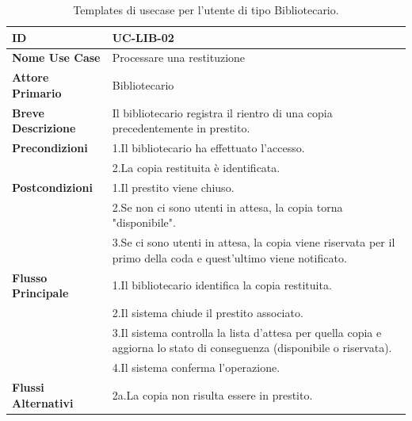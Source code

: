 \documentclass[
  italian,
  paper=a4,
  ,captions=tableheading
]{scrbook}
\begin{document}
\begin{table}[h!]
\begin{minipage}{0.45\textwidth}
{\begin{tabular}{|p{4.5cm}|p{10cm}|}
\textbf{ID} & UC-LIB-02 \\ \hline
\textbf{Nome Use Case} & Processare una restituzione \\ \hline
\textbf{Attore Primario} & Bibliotecario \\ \hline
\textbf{Breve Descrizione} & Il bibliotecario registra il rientro di una copia precedentemente in prestito. \\ \hline
\textbf{Precondizioni} & 1.\;Il bibliotecario ha effettuato l'accesso.\\
 & 2.\;La copia restituita è identificata. \\ \hline
\textbf{Postcondizioni} & 1.\;Il prestito viene chiuso.\\
 & 2.\;Se non ci sono utenti in attesa, la copia torna "disponibile".\\
 & 3.\;Se ci sono utenti in attesa, la copia viene riservata per il primo della coda e quest'ultimo viene notificato. \\ \hline
\textbf{Flusso Principale} & 1.\;Il bibliotecario identifica la copia restituita.\\
 & 2.\;Il sistema chiude il prestito associato.\\
 & 3.\;Il sistema controlla la lista d'attesa per quella copia e aggiorna lo stato di conseguenza (disponibile o riservata).\\
 & 4.\;Il sistema conferma l'operazione. \\ \hline
\textbf{Flussi Alternativi} & 2a.\;La copia non risulta essere in prestito. \\ \hline

    \hline
  \end{tabular}
}
\end{minipage}
\caption{Templates di usecase per l'utente di tipo Bibliotecario.}
\end{table}
\end{document}
